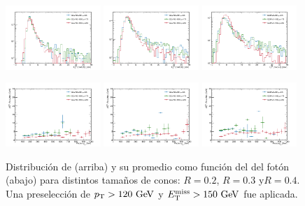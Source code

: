 \begin{figure}[!htbp]

  \centering
  \includegraphics[width=0.32\textwidth]{figures/iso_20}
  \includegraphics[width=0.32\textwidth]{figures/iso_30}
  \includegraphics[width=0.32\textwidth]{figures/iso_40}

  \includegraphics[width=0.32\textwidth]{figures/iso_20_pt}
  \includegraphics[width=0.32\textwidth]{figures/iso_30_pt}
  \includegraphics[width=0.32\textwidth]{figures/iso_40_pt}

  \caption{Distribución de {\etiso} (arriba) y su promedio como función del
    {\pt} del fotón (abajo) para distintos tamaños de conos: $R=0.2$, $R=0.3$ y$R=0.4$.
    Una preselección de $\pt>120\gev$ y $\met>150\gev$ fue aplicada.}
  \label{fig:photon_iso}
\end{figure}

